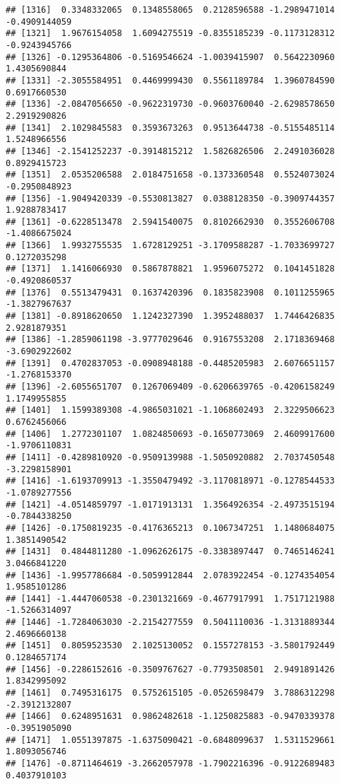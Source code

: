 \documentclass[
]{article}
\begin{document}
\begin{verbatim}
## [1316]  0.3348332065  0.1348558065  0.2128596588 -1.2989471014 -0.4909144059
## [1321]  1.9676154058  1.6094275519 -0.8355185239 -0.1173128312 -0.9243945766
## [1326] -0.1295364806 -0.5169546624 -1.0039415907  0.5642230960  1.4305690844
## [1331] -2.3055584951  0.4469999430  0.5561189784  1.3960784590  0.6917660530
## [1336] -2.0847056650 -0.9622319730 -0.9603760040 -2.6298578650  2.2919290826
## [1341]  2.1029845583  0.3593673263  0.9513644738 -0.5155485114  1.5248966556
## [1346] -2.1541252237 -0.3914815212  1.5826826506  2.2491036028  0.8929415723
## [1351]  2.0535206588  2.0184751658 -0.1373360548  0.5524073024 -0.2950848923
## [1356] -1.9049420339 -0.5530813827  0.0388128350 -0.3909744357  1.9288783417
## [1361] -0.6228513478  2.5941540075  0.8102662930  0.3552606708 -1.4086675024
## [1366]  1.9932755535  1.6728129251 -3.1709588287 -1.7033699727  0.1272035298
## [1371]  1.1416066930  0.5867878821  1.9596075272  0.1041451828 -0.4920860537
## [1376]  0.5513479431  0.1637420396  0.1835823908  0.1011255965 -1.3827967637
## [1381] -0.8918620650  1.1242327390  1.3952488037  1.7446426835  2.9281879351
## [1386] -1.2859061198 -3.9777029646  0.9167553208  2.1718369468 -3.6902922602
## [1391]  0.4702837053 -0.0908948188 -0.4485205983  2.6076651157 -1.2768153370
## [1396] -2.6055651707  0.1267069409 -0.6206639765 -0.4206158249  1.1749955855
## [1401]  1.1599389308 -4.9865031021 -1.1068602493  2.3229506623  0.6762456066
## [1406]  1.2772301107  1.0824850693 -0.1650773069  2.4609917600 -1.9706110831
## [1411] -0.4289810920 -0.9509139988 -1.5050920882  2.7037450548 -3.2298158901
## [1416] -1.6193709913 -1.3550479492 -3.1170818971 -0.1278544533 -1.0789277556
## [1421] -4.0514859797 -1.0171913131  1.3564926354 -2.4973515194 -0.7844338250
## [1426] -0.1750819235 -0.4176365213  0.1067347251  1.1480684075  1.3851490542
## [1431]  0.4844811280 -1.0962626175 -0.3383897447  0.7465146241  3.0466841220
## [1436] -1.9957786684 -0.5059912844  2.0783922454 -0.1274354054  1.9585101286
## [1441] -1.4447060538 -0.2301321669 -0.4677917991  1.7517121988 -1.5266314097
## [1446] -1.7284063030 -2.2154277559  0.5041110036 -1.3131889344  2.4696660138
## [1451]  0.8059523530  2.1025130052  0.1557278153 -3.5801792449  0.1284657174
## [1456] -0.2286152616 -0.3509767627 -0.7793508501  2.9491891426  1.8342995092
## [1461]  0.7495316175  0.5752615105 -0.0526598479  3.7886312298 -2.3912132807
## [1466]  0.6248951631  0.9862482618 -1.1250825883 -0.9470339378 -0.3951905090
## [1471]  1.0551397875 -1.6375090421 -0.6848099637  1.5311529661  1.8093056746
## [1476] -0.8711464619 -3.2662057978 -1.7902216396 -0.9122689483  0.4037910103

\end{verbatim}
\end{document}
